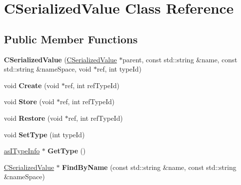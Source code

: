 \hypertarget{class_c_serialized_value}{}\section{C\+Serialized\+Value Class Reference}
\label{class_c_serialized_value}
\subsection*{Public Member Functions}
\begin{DoxyCompactItemize}
\item 
\mbox{\label{class_c_serialized_value_a4a17ff539b11fc3bf358dde412850040}} 
{\bfseries C\+Serialized\+Value} (\hyperlink{class_c_serialized_value}{C\+Serialized\+Value} $\ast$parent, const std\+::string \&name, const std\+::string \&name\+Space, void $\ast$ref, int type\+Id)
\item 
\mbox{\label{class_c_serialized_value_ac80415970a8d513a47b86276ed20beae}} 
void {\bfseries Create} (void $\ast$ref, int ref\+Type\+Id)
\item 
\mbox{\label{class_c_serialized_value_a1ce92f7cc0a6ef1b9295664c30fe9432}} 
void {\bfseries Store} (void $\ast$ref, int ref\+Type\+Id)
\item 
\mbox{\label{class_c_serialized_value_a58a55335e58683ad02bc78a2ce2eef27}} 
void {\bfseries Restore} (void $\ast$ref, int ref\+Type\+Id)
\item 
\mbox{\label{class_c_serialized_value_ac95712970e78726e2bdf8406e24f6d47}} 
void {\bfseries Set\+Type} (int type\+Id)
\item 
\mbox{\label{class_c_serialized_value_a8743d0419165e9007eb8cf7ffd81baa3}} 
\hyperlink{classas_i_type_info}{as\+I\+Type\+Info} $\ast$ {\bfseries Get\+Type} ()
\item 
\mbox{\label{class_c_serialized_value_aaa9d8be7c288aa81de5a657aa3ae1318}} 
\hyperlink{class_c_serialized_value}{C\+Serialized\+Value} $\ast$ {\bfseries Find\+By\+Name} (const std\+::string \&name, const std\+::string \&name\+Space)

\end{DoxyCompactItemize}
